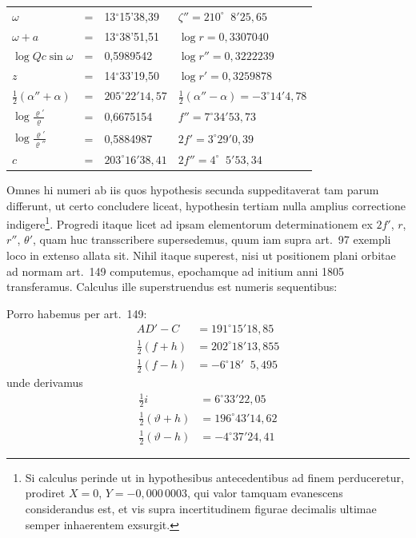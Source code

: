 \documentclass[12pt,a4paper]{article}
\begin{document}
\begin{center}
\begin{tabular}{llll}
\toprule
$\omega$ &=& 13$^\circ$15'38,39 & $\zeta'' = 210^\circ\;\;8'25,65$\\
$\omega + a$ &=& 13$^\circ$38'51,51 & $\log r = 0,3307040$\\
$\log Qc\sin\omega$ &=& 0,5989542 & $\log r'' = 0,3222239$\\
$z$ &=& 14$^\circ$33'19,50 & $\log r' = 0,3259878$\\
$\tfrac{1}{2}(\alpha'' + \alpha)$ &=& $205^\circ22'14,57$ & $\tfrac{1}{2}(\alpha'' - \alpha) = -3^\circ14'4,78$\\
$\log\tfrac{\varrho'}{\varrho}$ &=& 0,6675154 & $f'' = 7^\circ34'53,73$\\
$\log\tfrac{\varrho'}{\varrho''}$ &=& 0,5884987 & $2f' = 3^\circ29'0,39$\\
$c$ &=& $203^\circ16'38,41$ & $2f'' = 4^\circ\;\;5'53,34$\\
\bottomrule
\end{tabular}
\end{center}

Omnes hi numeri ab iis quos hypothesis secunda suppeditaverat tam parum differunt, ut certo concludere liceat, hypothesin tertiam nulla amplius correctione indigere\footnote{Si calculus perinde ut in hypothesibus antecedentibus ad finem perduceretur, prodiret $X = 0$, $Y = -0,000\,0003$, qui valor tamquam evanescens considerandus est, et vis supra incertitudinem figurae decimalis ultimae semper inhaerentem exsurgit.}. Progredi itaque licet ad ipsam elementorum determinationem ex $2f'$, $r$, $r''$, $\theta'$, quam huc transscribere supersedemus, quum iam supra art.~97 exempli loco in extenso allata sit. Nihil itaque superest, nisi ut positionem plani orbitae ad normam art.~149 computemus, epochamque ad initium anni 1805 transferamus. Calculus ille superstruendus est numeris sequentibus:

Porro habemus per art.~149:
\begin{align*}
AD' - C &= 191^\circ15'18,85\\
\tfrac{1}{2}(f + h) &= 202^\circ18'13,855\\
\tfrac{1}{2}(f - h) &= -6^\circ18'\;\;5,495
\end{align*}
unde derivamus
\begin{align*}
\tfrac{1}{2}i &= 6^\circ33'22,05\\
\tfrac{1}{2}(\vartheta + h) &= 196^\circ43'14,62\\
\tfrac{1}{2}(\vartheta - h) &= -4^\circ37'24,41
\end{align*}
\end{document}
